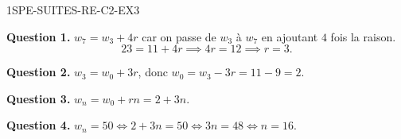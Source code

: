 
\begin{corrige}{1SPE-SUITES-RE-C2-EX3}


\textbf{Question 1.} $w_7 = w_3 + 4r$ car on passe de $w_3$ à $w_7$ en ajoutant $4$ fois la raison.
\[
23 = 11 + 4r \implies 4r = 12 \implies r = 3.
\]

\textbf{Question 2.} $w_3 = w_0 + 3r$, donc $w_0 = w_3 - 3r = 11 - 9 = 2$.

\textbf{Question 3.} $w_n = w_0 + rn = 2 + 3n$.

\textbf{Question 4.} $w_n = 50 \iff 2 + 3n = 50 \iff 3n = 48 \iff n = 16$.

\end{corrige}
